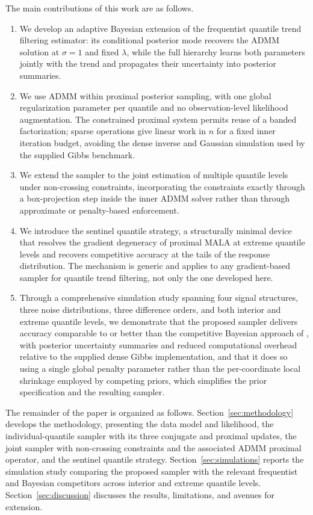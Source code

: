 The main contributions of this work are as follows.
\begin{enumerate}
    \item We develop an adaptive Bayesian extension of the frequentist quantile trend filtering estimator: its conditional posterior mode recovers the ADMM solution at $\sigma=1$ and fixed $\lambda$, while the full hierarchy learns both parameters jointly with the trend and propagates their uncertainty into posterior summaries.
    \item We use ADMM within proximal posterior sampling, with one global regularization parameter per quantile and no observation-level likelihood augmentation. The constrained proximal system permits reuse of a banded factorization; sparse operations give linear work in $n$ for a fixed inner iteration budget, avoiding the dense inverse and Gaussian simulation used by the supplied Gibbs benchmark.
    \item We extend the sampler to the joint estimation of multiple quantile levels under non-crossing constraints, incorporating the constraints exactly through a box-projection step inside the inner ADMM solver rather than through approximate or penalty-based enforcement.
    \item We introduce the sentinel quantile strategy, a structurally minimal device that resolves the gradient degeneracy of proximal MALA at extreme quantile levels and recovers competitive accuracy at the tails of the response distribution. The mechanism is generic and applies to any gradient-based sampler for quantile trend filtering, not only the one developed here.
    \item Through a comprehensive simulation study spanning four signal structures, three noise distributions, three difference orders, and both interior and extreme quantile levels, we demonstrate that the proposed sampler delivers accuracy comparable to or better than the competitive Bayesian approach of \citet{onizuka2024fast}, with posterior uncertainty summaries and reduced computational overhead relative to the supplied dense Gibbs implementation, and that it does so using a single global penalty parameter rather than the per-coordinate local shrinkage employed by competing priors, which simplifies the prior specification and the resulting sampler.
\end{enumerate}

The remainder of the paper is organized as follows. Section~\ref{sec:methodology} develops the methodology, presenting the data model and likelihood, the individual-quantile sampler with its three conjugate and proximal updates, the joint sampler with non-crossing constraints and the associated ADMM proximal operator, and the sentinel quantile strategy. Section~\ref{sec:simulations} reports the simulation study comparing the proposed sampler with the relevant frequentist and Bayesian competitors across interior and extreme quantile levels. Section~\ref{sec:discussion} discusses the results, limitations, and avenues for extension.
